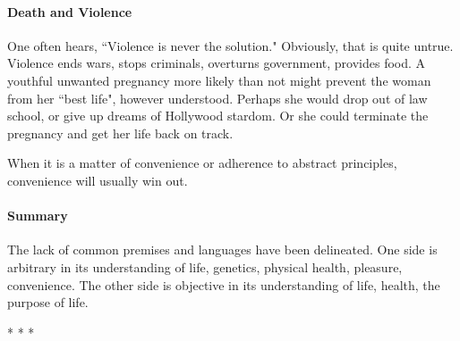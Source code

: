 \paragraph{Death and Violence}
One often hears, ``Violence is never the solution." Obviously, that is quite untrue. Violence ends wars, stops criminals, overturns government, provides food. A youthful unwanted pregnancy more likely than not might prevent the woman from her ``best life", however understood. Perhaps she would drop out of law school, or give up dreams of Hollywood stardom. Or she could terminate the pregnancy and get her life back on track.

When it is a matter of convenience or adherence to abstract principles, convenience will usually win out.

\paragraph{Summary}
The lack of common premises and languages have been delineated. One side is arbitrary in its understanding of life, genetics, physical health, pleasure, convenience. The other side is objective in its understanding of life, health, the purpose of life.




\begin{center}* * *\end{center}

